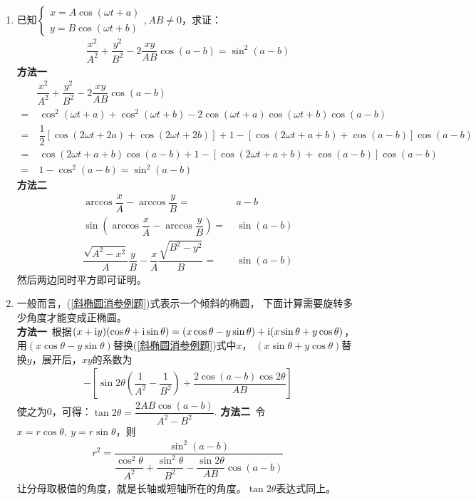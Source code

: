 \begin{enumerate}[label={【\textbf{例\thechapter.\arabic*}】},
 leftmargin=\inteval{\myenumleftmargin}pt,
 itemsep=\inteval{\myenumitempsep}pt,
 itemindent=\inteval{\myenumitemindent}pt]
\item 已知$ \begin{cases}
    x=A\cos(\omega t+a) \\
    y=B\cos(\omega t+b)
\end{cases}, AB\neq 0 $，求证：
\begin{align}\label{斜椭圆消参例题}
    \dfrac{x^2}{A^2}+\dfrac{y^2}{B^2}-2\dfrac{xy}{AB}\cos(a-b)=\sin^2(a-b)
\end{align}
\textbf{方法一}\ 
\begin{align*}
    & \dfrac{x^2}{A^2}+\dfrac{y^2}{B^2}-2\dfrac{xy}{AB}\cos(a-b) \\
    =&\  \cos^2(\omega t+a)+\cos^2(\omega t+b)-2\cos(\omega t+a)\cos(\omega t+b)\cos(a-b) \\
    =&\  \dfrac{1}{2}[\cos(2\omega t+2a)+\cos(2\omega t+2b)]+1-[\cos(2\omega t+a+b)+\cos(a-b)]\cos(a-b)\\
    =&\  \cos(2\omega t+a+b)\cos(a-b) +1-[\cos(2\omega t+a+b)+\cos(a-b)]\cos(a-b)\\
    =&\  1-\cos^2(a-b) =\sin^2(a-b)
\end{align*}
\textbf{方法二}\ 
\begin{align*}
    \arccos\dfrac{x}{A}-\arccos\dfrac{y}{B}=&\ a-b \\
    \sin\left( \arccos\dfrac{x}{A}-\arccos\dfrac{y}{B} \right) =&\ \sin(a-b) \\
    \dfrac{\sqrt{A^2-x^2}}{A}\dfrac{y}{B}-\dfrac{x}{A}\dfrac{\sqrt{B^2-y^2}}{B}=&\ \sin(a-b)
\end{align*}
然后两边同时平方即可证明。

\item 一般而言，(\ref{斜椭圆消参例题})式表示一个倾斜的椭圆，
下面计算需要旋转多少角度才能变成正椭圆。\\
\textbf{方法一}\ 根据$ (x+\mathrm{i} y)(\cos\theta +\mathrm{i}\sin \theta)=(x\cos\theta-y\sin\theta)+
\mathrm{i}(x\sin\theta+y\cos\theta) $，
用$ (x\cos\theta-y\sin\theta) $替换(\ref{斜椭圆消参例题})式中$ x $，
$ (x\sin\theta+y\cos\theta) $替换$ y $，展开后，$ xy $的系数为
\begin{align*}
    -\left[\sin2\theta\left(\dfrac{1}{A^2}-\dfrac{1}{B^2} \right) + \dfrac{2\cos(a-b)\cos2\theta }{AB}\right] 
\end{align*}
使之为0，可得：$ \tan2\theta =\dfrac{2AB\cos(a-b)}{A^2-B^2} $. 
\textbf{方法二}\ 令$ x=r\cos\theta,\ y=r\sin\theta $，则
\begin{align*}
    r^2=\dfrac{\sin^2(a-b)}{\dfrac{\cos^2\theta}{A^2}+
        \dfrac{ \sin^2\theta}{B^2}-\dfrac{\sin2\theta}{AB}\cos(a-b)}
\end{align*}
让分母取极值的角度，就是长轴或短轴所在的角度。$ \tan2\theta $表达式同上。 


\end{enumerate}
